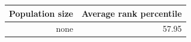 \begin{tabular}{rr}
\toprule
Population size & Average rank percentile \\
\midrule
none & 57.95 \\
\bottomrule
\end{tabular}
